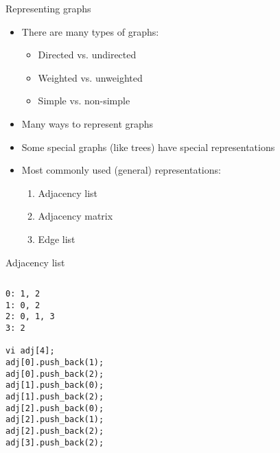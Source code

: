 \documentclass[12pt,t]{beamer}
\newcommand{\bi}{\begin{itemize}}
\newcommand{\ei}{\end{itemize}}
\begin{document}
\begin{frame}{Representing graphs}
    \vspace{20pt}
    \bi
        \item There are many types of graphs:
            \bi
                \item Directed vs. undirected
                \item Weighted vs. unweighted
                \item Simple vs. non-simple
            \ei
        \item Many ways to represent graphs
        \item Some special graphs (like trees) have special representations
        \item Most commonly used (general) representations:
            \begin{enumerate}
                \item Adjacency list
                \item Adjacency matrix
                \item Edge list
            \end{enumerate}
    \ei
\end{frame}

\begin{frame}[fragile]{Adjacency list}

    \begin{columns}[T]
        \begin{column}{.4\textwidth}
            \begin{verbatim}
0: 1, 2
1: 0, 2
2: 0, 1, 3
3: 2

vi adj[4];
adj[0].push_back(1);
adj[0].push_back(2);
adj[1].push_back(0);
adj[1].push_back(2);
adj[2].push_back(0);
adj[2].push_back(1);
adj[2].push_back(2);
adj[3].push_back(2);
            \end{verbatim}
        \end{column}%
        \hfill%
        \begin{column}{.4\textwidth}
            \begin{figure}
            \end{figure}
        \end{column}%
    \end{columns}
\end{frame}
\end{document}

